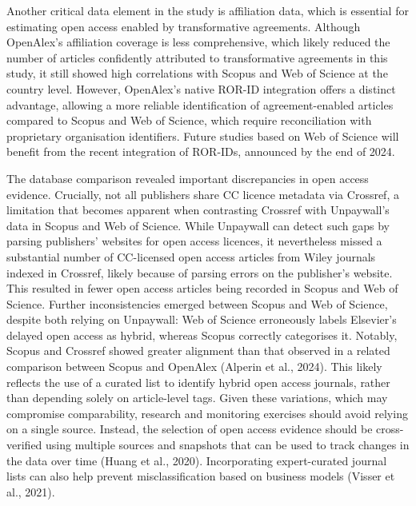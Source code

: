 \documentclass[a4paper,man,floatsintext,longtable,noextraspace,10pt]{apa6}
\begin{document}
Another critical data element in the study is affiliation data, which is
essential for estimating open access enabled by transformative
agreements. Although OpenAlex's affiliation coverage is less
comprehensive, which likely reduced the number of articles confidently
attributed to transformative agreements in this study, it still showed
high correlations with Scopus and Web of Science at the country level.
However, OpenAlex's native ROR-ID integration offers a distinct
advantage, allowing a more reliable identification of agreement-enabled
articles compared to Scopus and Web of Science, which require
reconciliation with proprietary organisation identifiers. Future studies
based on Web of Science will benefit from the recent integration of
ROR-IDs, announced by the end of 2024.

The database comparison revealed important discrepancies in open access
evidence. Crucially, not all publishers share CC licence metadata via
Crossref, a limitation that becomes apparent when contrasting Crossref
with Unpaywall's data in Scopus and Web of Science. While Unpaywall can
detect such gaps by parsing publishers' websites for open access
licences, it nevertheless missed a substantial number of CC-licensed
open access articles from Wiley journals indexed in Crossref, likely
because of parsing errors on the publisher's website. This resulted in
fewer open access articles being recorded in Scopus and Web of Science.
Further inconsistencies emerged between Scopus and Web of Science,
despite both relying on Unpaywall: Web of Science erroneously labels
Elsevier's delayed open access as hybrid, whereas Scopus correctly
categorises it. Notably, Scopus and Crossref showed greater alignment
than that observed in a related comparison between Scopus and OpenAlex
(Alperin et al., 2024). This likely reflects the use of a curated list
to identify hybrid open access journals, rather than depending solely on
article-level tags. Given these variations, which may compromise
comparability, research and monitoring exercises should avoid relying on
a single source. Instead, the selection of open access evidence should
be cross-verified using multiple sources and snapshots that can be used
to track changes in the data over time (Huang et al., 2020).
Incorporating expert-curated journal lists can also help prevent
misclassification based on business models (Visser et al., 2021).
\end{document}
